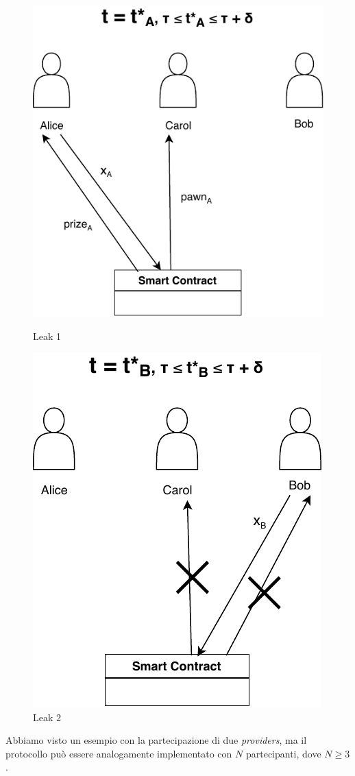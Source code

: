 \begin{figure}[H]
	\begin{minipage}{0.5\textwidth}
		\centering
		\includegraphics[width=.8\linewidth]{images/chap_protocollo/avanzato-leak-2-a.pdf}
		\caption{Leak 1}
	\end{minipage}\hfill
	\begin{minipage}{0.5\textwidth}
		\centering
		\includegraphics[width=.71\linewidth]{images/chap_protocollo/avanzato-leak-2-b.pdf}
		\caption{Leak 2}
	\end{minipage}
\end{figure}

Abbiamo visto un esempio con la partecipazione di due \textit{providers},
ma il protocollo
può essere analogamente implementato con $ N $ partecipanti, dove $ N \geq 3 $.

